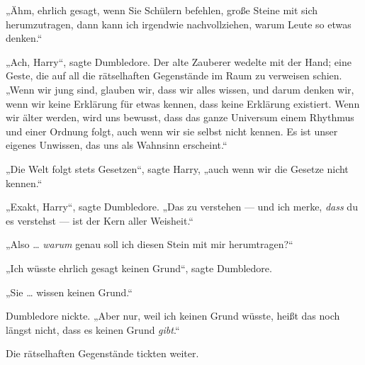 „Ähm, ehrlich gesagt, wenn Sie Schülern befehlen, große Steine mit sich herumzutragen, dann kann ich irgendwie nachvollziehen, warum Leute so etwas denken.“

„Ach, Harry“, sagte Dumbledore. Der alte Zauberer wedelte mit der Hand; eine Geste, die auf all die rätselhaften Gegenstände im Raum zu verweisen schien.
„Wenn wir jung sind, glauben wir, dass wir alles wissen, und darum denken wir, wenn wir keine Erklärung für etwas kennen, dass keine Erklärung existiert. Wenn wir älter werden, wird uns bewusst, dass das ganze Universum einem Rhythmus und einer Ordnung folgt, auch wenn wir sie selbst nicht kennen. Es ist unser eigenes Unwissen, das uns als Wahnsinn erscheint.“

„Die Welt folgt stets Gesetzen“, sagte Harry, „auch wenn wir die Gesetze nicht kennen.“

„Exakt, Harry“, sagte Dumbledore.
„Das zu verstehen — und ich merke, \emph{dass} du es verstehst — ist der Kern aller Weisheit.“

„Also … \emph{warum} genau soll ich diesen Stein mit mir herumtragen?“

„Ich wüsste ehrlich gesagt keinen Grund“, sagte Dumbledore.

„Sie … wissen keinen Grund.“

Dumbledore nickte.
„Aber nur, weil ich keinen Grund wüsste, heißt das noch längst nicht, dass es keinen Grund \emph{gibt}.“

Die rätselhaften Gegenstände tickten weiter.

